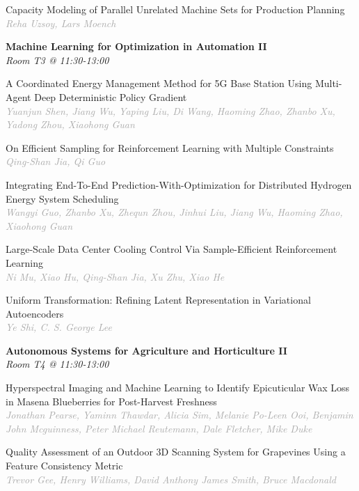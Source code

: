 \begin{multicols*}{2}
\small Capacity Modeling of Parallel Unrelated Machine Sets for Production Planning\\ 
\footnotesize \textcolor{darkgray}{\textit{Reha Uzsoy, Lars  Moench}}

\normalsize \textbf{Machine Learning for Optimization in Automation II}\\
\small \textit{Room T3 @ 11:30-13:00}

\small A Coordinated Energy Management Method for 5G Base Station Using Multi-Agent Deep Deterministic Policy Gradient\\ 
\footnotesize \textcolor{darkgray}{\textit{Yuanjun Shen, Jiang  Wu, Yaping  Liu, Di  Wang, Haoming  Zhao, Zhanbo  Xu, Yadong  Zhou, Xiaohong  Guan}}

\small On Efficient Sampling for Reinforcement Learning with Multiple Constraints\\ 
\footnotesize \textcolor{darkgray}{\textit{Qing-Shan Jia, Qi  Guo}}

\small Integrating End-To-End Prediction-With-Optimization for Distributed Hydrogen Energy System Scheduling\\ 
\footnotesize \textcolor{darkgray}{\textit{Wangyi Guo, Zhanbo  Xu, Zhequn  Zhou, Jinhui  Liu, Jiang  Wu, Haoming  Zhao, Xiaohong  Guan}}

\small Large-Scale Data Center Cooling Control Via Sample-Efficient Reinforcement Learning\\ 
\footnotesize \textcolor{darkgray}{\textit{Ni Mu, Xiao  Hu, Qing-Shan  Jia, Xu  Zhu, Xiao  He}}

\small Uniform Transformation: Refining Latent Representation in Variational Autoencoders\\ 
\footnotesize \textcolor{darkgray}{\textit{Ye Shi, C. S. George  Lee}}

\normalsize \textbf{Autonomous Systems for Agriculture and Horticulture II}\\
\small \textit{Room T4 @ 11:30-13:00}

\small Hyperspectral Imaging and Machine Learning to Identify Epicuticular Wax Loss in Masena Blueberries for Post-Harvest Freshness\\ 
\footnotesize \textcolor{darkgray}{\textit{Jonathan Pearse, Yaminn  Thawdar, Alicia  Sim, Melanie Po-Leen  Ooi, Benjamin John  Mcguinness, Peter Michael  Reutemann, Dale  Fletcher, Mike  Duke}}

\small Quality Assessment of an Outdoor 3D Scanning System for Grapevines Using a Feature Consistency Metric\\ 
\footnotesize \textcolor{darkgray}{\textit{Trevor Gee, Henry  Williams, David Anthony James  Smith, Bruce  Macdonald}}


\end{multicols*}
